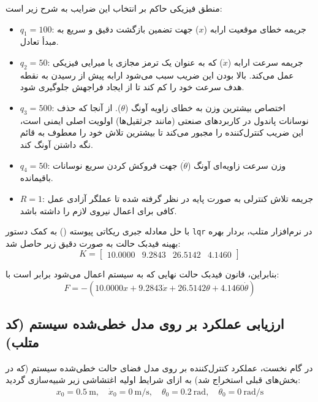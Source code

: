 \documentclass[a4paper,12pt]{article}
\begin{document}
منطق فیزیکی حاکم بر انتخاب این ضرایب به شرح زیر است:
\begin{itemize}
    \item $q_1 = 100$: جریمه خطای موقعیت ارابه ($x$) جهت تضمین بازگشت دقیق و سریع به مبدأ تعادل.
    \item $q_2 = 50$: جریمه سرعت ارابه ($\dot{x}$) که به عنوان یک ترمز مجازی یا میرایی فیزیکی عمل می‌کند. بالا بودن این ضریب سبب می‌شود ارابه پیش از رسیدن به نقطه هدف سرعت خود را کم کند تا از ایجاد فراجهش جلوگیری شود.
    \item $q_3 = 500$: اختصاص بیشترین وزن به خطای زاویه آونگ ($\theta$). از آنجا که حذف نوسانات پاندول در کاربردهای صنعتی (مانند جرثقیل‌ها) اولویت اصلی ایمنی است، این ضریب کنترل‌کننده را مجبور می‌کند تا بیشترین تلاش خود را معطوف به قائم نگه داشتن آونگ کند.
    \item $q_4 = 50$: وزن سرعت زاویه‌ای آونگ ($\dot{\theta}$) جهت فروکش کردن سریع نوسانات باقیمانده.
    \item $R = 1$: جریمه تلاش کنترلی به صورت پایه در نظر گرفته شده تا عملگر آزادی عمل کافی برای اعمال نیروی لازم را داشته باشد.
\end{itemize}

با حل معادله جبری ریکاتی پیوسته () به کمک دستور \texttt{lqr} در نرم‌افزار متلب، بردار بهره بهینه فیدبک حالت به صورت دقیق زیر حاصل شد:
\begin{equation}
    K = \begin{bmatrix} 10.0000 & 9.2843 & 26.5142 & 4.1460 \end{bmatrix}
\end{equation}

بنابراین، قانون فیدبک حالت نهایی که به سیستم اعمال می‌شود برابر است با:
\begin{equation}
    F = -(10.0000 x + 9.2843 \dot{x} + 26.5142 \theta + 4.1460 \dot{\theta})
\end{equation}

\subsection{ارزیابی عملکرد بر روی مدل خطی‌شده سیستم (کد متلب)}

در گام نخست، عملکرد کنترل‌کننده بر روی مدل فضای حالت خطی‌شده سیستم (که در بخش‌های قبلی استخراج شد) به ازای شرایط اولیه اغتشاشی زیر شبیه‌سازی گردید:
\[
    x_0 = 0.5~\mathrm{m}, \quad \dot{x}_0 = 0~\mathrm{m/s}, \quad \theta_0 = 0.2~\mathrm{rad}, \quad \dot{\theta}_0 = 0~\mathrm{rad/s}
\]
\end{document}
